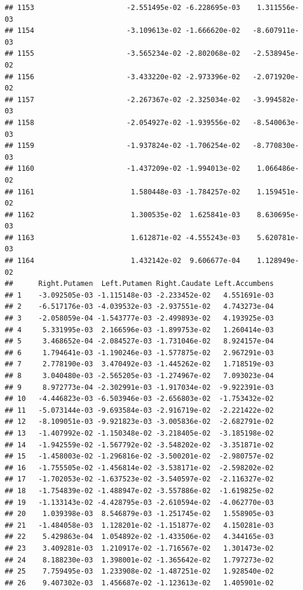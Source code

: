 \documentclass[
]{article}
\begin{document}
\begin{verbatim}
## 1153                      -2.551495e-02 -6.228695e-03    1.311556e-03
## 1154                      -3.109613e-02 -1.666620e-02   -8.607911e-03
## 1155                      -3.565234e-02 -2.802068e-02   -2.538945e-02
## 1156                      -3.433220e-02 -2.973396e-02   -2.071920e-02
## 1157                      -2.267367e-02 -2.325034e-02   -3.994582e-03
## 1158                      -2.054927e-02 -1.939556e-02   -8.540063e-03
## 1159                      -1.937824e-02 -1.706254e-02   -8.770830e-03
## 1160                      -1.437209e-02 -1.994013e-02    1.066486e-02
## 1161                       1.580448e-03 -1.784257e-02    1.159451e-02
## 1162                       1.300535e-02  1.625841e-03    8.630695e-03
## 1163                       1.612871e-02 -4.555243e-03    5.620781e-03
## 1164                       1.432142e-02  9.606677e-04    1.128949e-02
##      Right.Putamen  Left.Putamen Right.Caudate Left.Accumbens
## 1    -3.092505e-03 -1.115148e-03 -2.233452e-02   4.551691e-03
## 2    -6.517176e-03 -4.039532e-03 -2.937551e-02   4.743273e-04
## 3    -2.058059e-04 -1.543777e-03 -2.499893e-02   4.193925e-03
## 4     5.331995e-03  2.166596e-03 -1.899753e-02   1.260414e-03
## 5     3.468652e-04 -2.084527e-03 -1.731046e-02   8.924157e-04
## 6     1.794641e-03 -1.190246e-03 -1.577875e-02   2.967291e-03
## 7     2.778190e-03  3.470492e-03 -1.445262e-02   1.718519e-03
## 8     3.040480e-03 -2.565205e-03 -1.274967e-02   7.093023e-04
## 9     8.972773e-04 -2.302991e-03 -1.917034e-02  -9.922391e-03
## 10   -4.446823e-03 -6.503946e-03 -2.656803e-02  -1.753432e-02
## 11   -5.073144e-03 -9.693584e-03 -2.916719e-02  -2.221422e-02
## 12   -8.109051e-03 -9.921823e-03 -3.005836e-02  -2.682791e-02
## 13   -1.407992e-02 -1.150348e-02 -3.218405e-02  -3.185198e-02
## 14   -1.942559e-02 -1.567792e-02 -3.548202e-02  -3.351871e-02
## 15   -1.458003e-02 -1.296816e-02 -3.500201e-02  -2.980757e-02
## 16   -1.755505e-02 -1.456814e-02 -3.538171e-02  -2.598202e-02
## 17   -1.702053e-02 -1.637523e-02 -3.540597e-02  -2.116327e-02
## 18   -1.754839e-02 -1.488947e-02 -3.557886e-02  -1.619825e-02
## 19   -1.133143e-02 -4.428795e-03 -2.610594e-02  -4.062770e-03
## 20    1.039398e-03  8.546879e-03 -1.251745e-02   1.558905e-03
## 21   -1.484058e-03  1.128201e-02 -1.151877e-02   4.150281e-03
## 22    5.429863e-04  1.054892e-02 -1.433506e-02   4.344165e-03
## 23    3.409281e-03  1.210917e-02 -1.716567e-02   1.301473e-02
## 24    8.188230e-03  1.398001e-02 -1.365642e-02   1.797273e-02
## 25    7.759495e-03  1.233908e-02 -1.487251e-02   1.928540e-02
## 26    9.407302e-03  1.456687e-02 -1.123613e-02   1.405901e-02

\end{verbatim}
\end{document}
